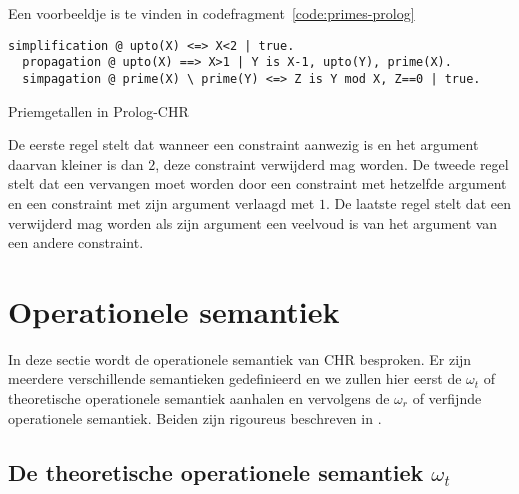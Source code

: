 Een voorbeeldje is te vinden in codefragment~\ref{code:primes-prolog}
\begin{exCode}[bp]
\begin{Verbatim}[frame=single]
  simplification @ upto(X) <=> X<2 | true.
  propagation @ upto(X) ==> X>1 | Y is X-1, upto(Y), prime(X).
  simpagation @ prime(X) \ prime(Y) <=> Z is Y mod X, Z==0 | true.
\end{Verbatim}
\caption{Priemgetallen in Prolog-CHR}
\label{code:primes-prolog}
\end{exCode}
De eerste regel stelt dat wanneer een  constraint aanwezig is en het argument daarvan kleiner is dan $2$, deze constraint verwijderd mag worden. De tweede regel stelt dat een  vervangen moet worden door een  constraint met hetzelfde argument en een  constraint met zijn argument verlaagd met $1$. De laatste regel stelt dat een  verwijderd mag worden als zijn argument een veelvoud is van het argument van een andere  constraint.

\section{Operationele semantiek}

In deze sectie wordt de operationele semantiek van CHR besproken. Er zijn meerdere verschillende semantieken gedefinieerd en we zullen hier eerst de $\omega_t$ of theoretische operationele semantiek aanhalen en vervolgens de $\omega_r$ of verfijnde operationele semantiek. Beiden zijn rigoureus beschreven in \cite{refined}.

\subsection{De theoretische operationele semantiek $\omega_t$} \label{sec:omegat}

